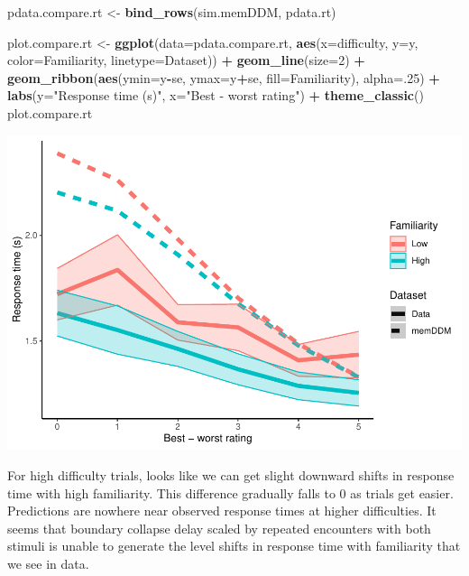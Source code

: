 \documentclass[
]{book}
\newenvironment{Shaded}{\begin{snugshade}}{\end{snugshade}}
\newcommand{\AttributeTok}[1]{\textcolor[rgb]{0.13,0.29,0.53}{#1}}
\newcommand{\DecValTok}[1]{\textcolor[rgb]{0.00,0.00,0.81}{#1}}
\newcommand{\FunctionTok}[1]{\textcolor[rgb]{0.13,0.29,0.53}{\textbf{#1}}}
\newcommand{\NormalTok}[1]{#1}
\newcommand{\OtherTok}[1]{\textcolor[rgb]{0.56,0.35,0.01}{#1}}
\newcommand{\SpecialCharTok}[1]{\textcolor[rgb]{0.81,0.36,0.00}{\textbf{#1}}}
\newcommand{\StringTok}[1]{\textcolor[rgb]{0.31,0.60,0.02}{#1}}
\begin{document}
\begin{Shaded}
\begin{Highlighting}[]
\NormalTok{pdata.compare.rt }\OtherTok{\textless{}{-}} \FunctionTok{bind\_rows}\NormalTok{(sim.memDDM, pdata.rt)}

\NormalTok{plot.compare.rt }\OtherTok{\textless{}{-}} \FunctionTok{ggplot}\NormalTok{(}\AttributeTok{data=}\NormalTok{pdata.compare.rt, }\FunctionTok{aes}\NormalTok{(}\AttributeTok{x=}\NormalTok{difficulty, }\AttributeTok{y=}\NormalTok{y, }\AttributeTok{color=}\NormalTok{Familiarity, }\AttributeTok{linetype=}\NormalTok{Dataset)) }\SpecialCharTok{+}
  \FunctionTok{geom\_line}\NormalTok{(}\AttributeTok{size=}\DecValTok{2}\NormalTok{) }\SpecialCharTok{+}
  \FunctionTok{geom\_ribbon}\NormalTok{(}\FunctionTok{aes}\NormalTok{(}\AttributeTok{ymin=}\NormalTok{y}\SpecialCharTok{{-}}\NormalTok{se, }\AttributeTok{ymax=}\NormalTok{y}\SpecialCharTok{+}\NormalTok{se, }\AttributeTok{fill=}\NormalTok{Familiarity), }\AttributeTok{alpha=}\NormalTok{.}\DecValTok{25}\NormalTok{) }\SpecialCharTok{+}
  \FunctionTok{labs}\NormalTok{(}\AttributeTok{y=}\StringTok{"Response time (s)"}\NormalTok{, }\AttributeTok{x=}\StringTok{"Best {-} worst rating"}\NormalTok{) }\SpecialCharTok{+}
  \FunctionTok{theme\_classic}\NormalTok{()}
\NormalTok{plot.compare.rt}
\end{Highlighting}
\end{Shaded}

\includegraphics{LateNightBayes_files/figure-latex/unnamed-chunk-68-1.pdf}

For high difficulty trials, looks like we can get slight downward shifts in response time with high familiarity. This difference gradually falls to 0 as trials get easier. Predictions are nowhere near observed response times at higher difficulties. It seems that boundary collapse delay scaled by repeated encounters with both stimuli is unable to generate the level shifts in response time with familiarity that we see in data.
\end{document}
